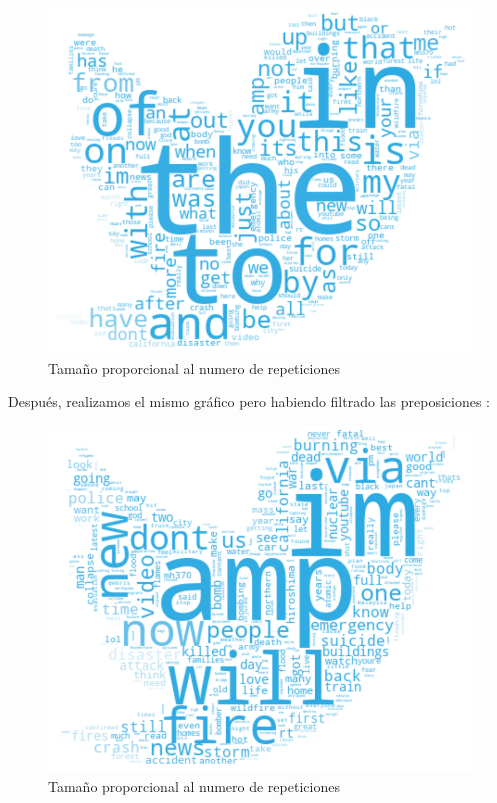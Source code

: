 \documentclass[titlepage,a4paper]{article}
\begin{document}
     \begin{figure}[H]
    \centering
    \includegraphics[width=1\textwidth]{graficos/Analisis Lexico Grafico/PalabrasMasUsadasSinFiltro.png}
    \caption{Tamaño proporcional al numero de repeticiones}
    \end{figure}
    
    Después, realizamos el mismo gráfico pero habiendo filtrado las preposiciones :
    
    \begin{figure}[H]
    \centering
    \includegraphics[width=1\textwidth]{graficos/Analisis Lexico Grafico/PalabrasMasUsadasConFiltro.png}
    \caption{Tamaño proporcional al numero de repeticiones}
    \end{figure}
    
\end{document}
